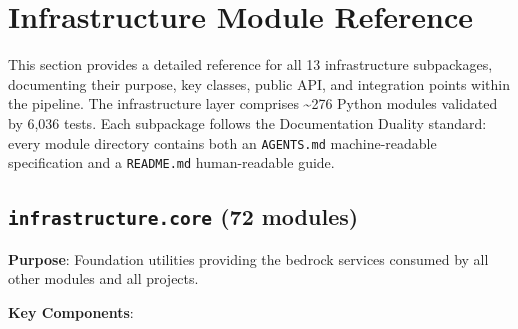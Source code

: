 \documentclass[
]{article}
\begin{document}
\newpage

\section{Infrastructure Module
Reference}\label{infrastructure-module-reference}

This section provides a detailed reference for all 13 infrastructure
subpackages, documenting their purpose, key classes, public API, and
integration points within the pipeline. The infrastructure layer
comprises \textasciitilde276 Python modules validated by 6,036 tests.
Each subpackage follows the Documentation Duality standard: every module
directory contains both an \texttt{AGENTS.md} machine-readable
specification and a \texttt{README.md} human-readable guide.

\subsection{\texorpdfstring{\texttt{infrastructure.core} (72
modules)}{infrastructure.core (72 modules)}}\label{infrastructure.core-72-modules}

\textbf{Purpose}: Foundation utilities providing the bedrock services
consumed by all other modules and all projects.

\textbf{Key Components}:
\end{document}

